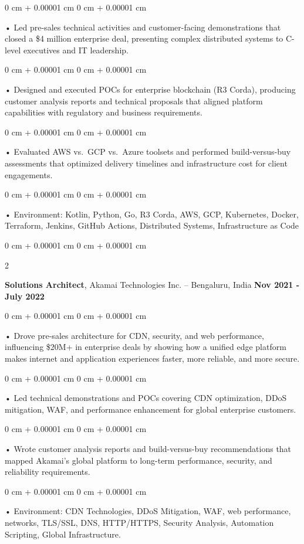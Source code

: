 \documentclass[10pt, letterpaper]{article}
\newenvironment{onecolentry}{
    \begin{adjustwidth}{
        0 cm + 0.00001 cm
    }{
        0 cm + 0.00001 cm
    }
}{
    \end{adjustwidth}
} %
\newenvironment{twocolentry}[2][]{
    \onecolentry
    \def\secondColumn{#2}
    \setcolumnwidth{\fill, 4.5 cm}
    \begin{paracol}{2}
}{
    \switchcolumn \raggedleft \secondColumn
    \end{paracol}
    \endonecolentry
} %
\begin{document}
        \begin{onecolentry}
             • Led pre-sales technical activities and customer-facing demonstrations that closed a \$4 million enterprise deal, presenting complex distributed systems to C-level executives and IT leadership.
        \end{onecolentry}
        \begin{onecolentry}
             • Designed and executed POCs for enterprise blockchain (R3 Corda), producing customer analysis reports and technical proposals that aligned platform capabilities with regulatory and business requirements.
        \end{onecolentry}
        \begin{onecolentry}
             • Evaluated AWS vs.\ GCP vs.\ Azure toolsets and performed build-versus-buy assessments that optimized delivery timelines and infrastructure cost for client engagements.
        \end{onecolentry}
        \begin{onecolentry}
             • Environment: Kotlin, Python, Go, R3 Corda, AWS, GCP, Kubernetes, Docker, Terraform, Jenkins, GitHub Actions, Distributed Systems, Infrastructure as Code
        \end{onecolentry}
        \vspace{0.1cm}

        \begin{twocolentry}{
            \textbf{Nov 2021 - July 2022}
        }
            \textbf{Solutions Architect}, Akamai Technologies Inc. -- Bengaluru, India \end{twocolentry}
        \begin{onecolentry}
            • Drove pre-sales architecture for CDN, security, and web performance, influencing \$20M+ in enterprise deals by showing how a unified edge platform makes internet and application experiences faster, more reliable, and more secure.
        \end{onecolentry}
        \begin{onecolentry}
            • Led technical demonstrations and POCs covering CDN optimization, DDoS mitigation, WAF, and performance enhancement for global enterprise customers.
        \end{onecolentry}
        \begin{onecolentry}
             • Wrote customer analysis reports and build-versus-buy recommendations that mapped Akamai's global platform to long-term performance, security, and reliability requirements.
        \end{onecolentry}
        \begin{onecolentry}
             • Environment: CDN Technologies, DDoS Mitigation, WAF, web performance, networks, TLS/SSL, DNS, HTTP/HTTPS, Security Analysis, Automation Scripting, Global Infrastructure.
        \end{onecolentry}
\end{document}
